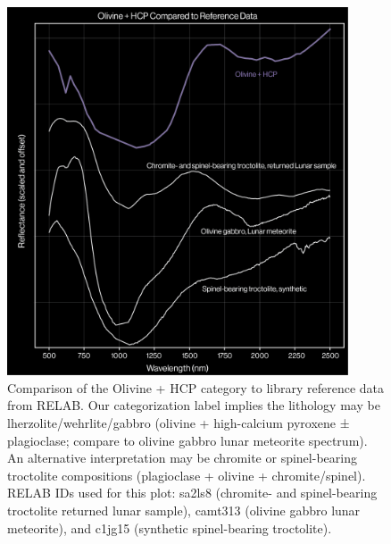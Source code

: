 \documentclass[12pt]{article}
\newenvironment{figurehere}[1][0.85]
  {\begin{figure}[p]
   \begin{minipage}[c][0.80\textheight][c]{\linewidth}
   \centering
   \setlength{\textfloatsep}{0pt}}
  {\end{minipage}
   \end{figure}}
\begin{document}
\begin{figurehere}
    \includegraphics[width=0.9\textwidth]{extended_data/ED6_olivine_hcp_spec_fig.png}
    \caption[Comparison of Olivine + HCP category to library reference data.]{Comparison of the Olivine + HCP category to library reference data from RELAB. Our categorization label implies the lithology may be lherzolite/wehrlite/gabbro (olivine + high-calcium pyroxene ± plagioclase; compare to olivine gabbro lunar meteorite spectrum). An alternative interpretation may be chromite or spinel-bearing troctolite compositions (plagioclase + olivine + chromite/spinel). RELAB IDs used for this plot: sa2ls8 (chromite- and spinel-bearing troctolite returned lunar sample), camt313 (olivine gabbro lunar meteorite), and c1jg15 (synthetic spinel-bearing troctolite).}
    \label{fig:extended_data_figure6}
\end{figurehere}

\clearpage
\end{document}
